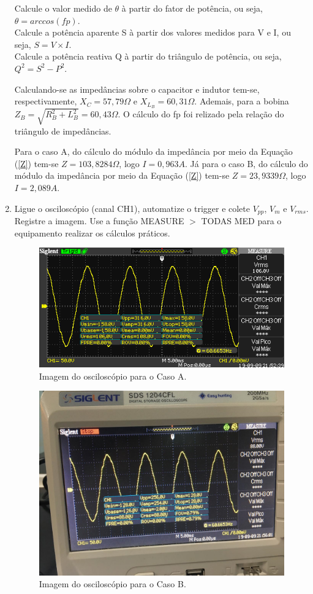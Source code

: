 \documentclass[a4paper,12pt,oneside,openany,table,xcdraw]{article}
\begin{document}
\begin{enumerate}[1 - ]
\noindent\text{[1]} Calcule o valor medido de $\theta$ à partir do fator de potência, ou seja, $\theta = arccos(fp)$. \\
\noindent\text{[2]} Calcule a potência aparente S à partir dos valores medidos para V e I, ou seja, $S=V\times I$. \\
\noindent\text{[3]} Calcule a potência reativa Q à partir do triângulo de potência, ou seja, $Q^2=S^2-P^2$. 

Calculando-se as impedâncias sobre o capacitor e indutor tem-se, respectivamente, $X_{C}=57,79\Omega$ e $X_{L_B}=60,31\Omega$.  Ademais, para a bobina $Z_B=\sqrt{R_B^2+L_B^2}=60,43\Omega$. O cálculo do fp foi relizado pela relação do triângulo de impedâncias.

Para o caso A, do cálculo do módulo da impedância por meio da Equação (\ref{Z}) tem-se $Z=103,8284\Omega$, logo $I=0,963A$.
Já para o caso B, do cálculo do módulo da impedância por meio da Equação (\ref{Z}) tem-se $Z=23,9339\Omega$, logo $I=2,089A$.

\item Ligue o osciloscópio (canal CH1), automatize o trigger e colete $V_{pp}$, $V_m$ e $V_{rms}$. Registre a imagem.
Use a função MEASURE $>$ TODAS MED para o equipamento realizar os cálculos práticos.

\begin{figure}[H]
\centering
\captionsetup{font=scriptsize}
\includegraphics[width=11cm]{osc1}
\caption{Imagem do osciloscópio para o Caso A.}
\label{osc1}
\end{figure}
\begin{figure}[H]
\centering
\captionsetup{font=scriptsize}
\includegraphics[width=11cm]{osc2}
\caption{Imagem do osciloscópio para o Caso B.}
\label{osc2}
\end{figure}


\end{enumerate}
\end{document}
